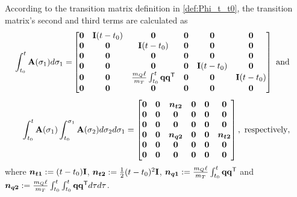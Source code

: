 \documentclass[journal,onecolumn]{IEEEtran}
\begin{document}
According to the transition matrix definition in \eqref{def:Phi_t_t0},  the transition matrix's second and third terms are calculated as
%
\begin{align}
	\int_{t_0}^t{\mathbf A}(\sigma_1)d\sigma_1= 
	&\begin{bmatrix}
			{\bf 0}  & {\bf I}(t-t_0) & {\bf 0} & {\bf 0} & {\bf 0} & {\bf 0}\\
			{\bf 0}  & {\bf 0} & {\bf I}(t-t_0) & {\bf 0} & {\bf 0} & {\bf 0}\\
			{\bf 0}  & {\bf 0} & {\bf 0} & {\bf 0} & {\bf 0} & {\bf 0}\\
			{\bf 0}  & {\bf 0} & {\bf 0} & {\bf 0} & {\bf I}(t-t_0) & {\bf 0}\\
			{\bf 0}  & {\bf 0} & \frac{\mQ\ell}{\mT}\int_{t_0}^t\dir\dir[T] & {\bf 0} & {\bf 0} & {\bf I}(t-t_0)\\
			{\bf 0}  & {\bf 0} & {\bf 0} & {\bf 0} & {\bf 0} & {\bf 0}
		\end{bmatrix}~\text{and}
\end{align}
%
\begin{align}
	\int_{t_0}^t{\mathbf A}(\sigma_1)\int_{t_0}^{\sigma_1}{\mathbf A}(\sigma_2)d\sigma_2d\sigma_1=
	\begin{bmatrix}
			{\bf 0}  & {\bf 0} & \boldsymbol{n_{t2}} & {\bf 0} & {\bf 0} & {\bf 0}\\
			{\bf 0}  & {\bf 0} & {\bf 0} & {\bf 0} & {\bf 0} & {\bf 0}\\
			{\bf 0}  & {\bf 0} & {\bf 0} & {\bf 0} & {\bf 0} & {\bf 0}\\
			{\bf 0}  & {\bf 0} & \boldsymbol{n_{q2}} & {\bf 0} & {\bf 0} & \boldsymbol{n_{t2}}\\
			{\bf 0}  & {\bf 0} & {\bf 0} & {\bf 0} & {\bf 0} & {\bf 0}\\
			{\bf 0}  & {\bf 0} & {\bf 0} & {\bf 0} & {\bf 0} & {\bf 0}
		\end{bmatrix},~\text{respectively},
\end{align}
where $\boldsymbol{n_{t1}}:=(t-t_0){\bf I}$, $\boldsymbol{n_{t2}}:=\frac{1}{2}(t-t_0)^2{\bf I}$, $\bs{n_{q1}}:=\frac{\mQ\ell}{\mT}\int_{t_0}^t\dir\dir[T]$ and
$\bs{n_{q2}}:=\frac{\mQ\ell}{\mT}\int_{t_0}^t\int_{t_0}^t\dir\dir[T]d\tau d\tau$.
\end{document}
